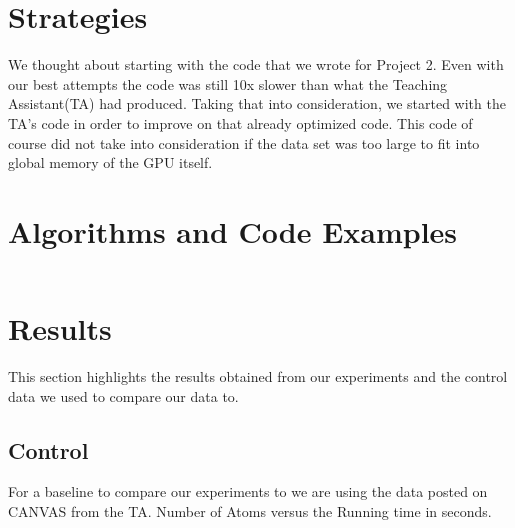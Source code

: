 \documentclass[twocolumn]{article}
\begin{document}
 
 
\section{Strategies}
We thought about starting with the code that we wrote for Project 2. Even with our best attempts the code was still 10x slower than what the Teaching Assistant(TA) had produced. Taking that into consideration, we started with the TA's code in order to improve on that already optimized code. This code of course did not take into consideration if the data set was too large to fit into global memory of the GPU itself. 



\section{Algorithms and Code Examples}

\begin{lstlisting}
\end{lstlisting}




\section{Results}
This section highlights the results obtained from our experiments and the control data we used to compare our data to.

\subsection{Control}
For a baseline  to compare our experiments to we are using the data posted on CANVAS from the TA. Number of Atoms versus the Running time in seconds.
\end{document}
